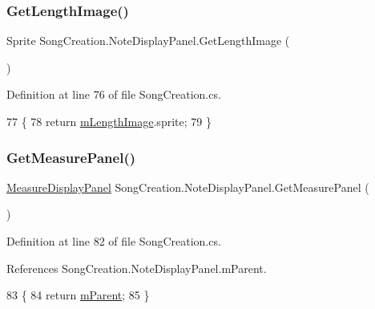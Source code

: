 \subsubsection{\texorpdfstring{Get\+Length\+Image()}{GetLengthImage()}}
{\footnotesize\ttfamily Sprite Song\+Creation.\+Note\+Display\+Panel.\+Get\+Length\+Image (\begin{DoxyParamCaption}{ }\end{DoxyParamCaption})}



Definition at line 76 of file Song\+Creation.\+cs.


\begin{DoxyCode}
77         \{
78             \textcolor{keywordflow}{return} \hyperlink{class_song_creation_1_1_note_display_panel_a88560efe222dafc26795c508bcf5b5a2}{mLengthImage}.sprite;
79         \}
\end{DoxyCode}
\mbox{\label{class_song_creation_1_1_note_display_panel_a9b9552bd8601886993f39540f9378fc4}} 
\subsubsection{\texorpdfstring{Get\+Measure\+Panel()}{GetMeasurePanel()}}
{\footnotesize\ttfamily \hyperlink{class_song_creation_1_1_measure_display_panel}{Measure\+Display\+Panel} Song\+Creation.\+Note\+Display\+Panel.\+Get\+Measure\+Panel (\begin{DoxyParamCaption}{ }\end{DoxyParamCaption})}



Definition at line 82 of file Song\+Creation.\+cs.



References Song\+Creation.\+Note\+Display\+Panel.\+m\+Parent.


\begin{DoxyCode}
83         \{
84             \textcolor{keywordflow}{return} \hyperlink{class_song_creation_1_1_note_display_panel_aa0d0186ce889ffd63cfe7587f48463c9}{mParent};
85         \}
\end{DoxyCode}
\mbox{\label{class_song_creation_1_1_note_display_panel_ac3736184f5991e2d24e408245dc62cdb}} 
